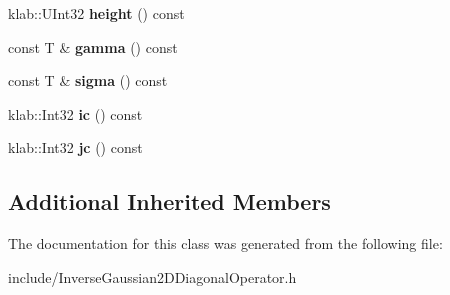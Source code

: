 \begin{DoxyCompactItemize}
\item 
klab\+::\+U\+Int32 {\bfseries height} () const \hypertarget{classkl1p_1_1TInverseGaussian2DDiagonalOperator_a218701d42bb73a32940a0e85230b5a8b}{}\label{classkl1p_1_1TInverseGaussian2DDiagonalOperator_a218701d42bb73a32940a0e85230b5a8b}

\item 
const T \& {\bfseries gamma} () const \hypertarget{classkl1p_1_1TInverseGaussian2DDiagonalOperator_aa57daba3bfaf40f9b4f5f19553b96e40}{}\label{classkl1p_1_1TInverseGaussian2DDiagonalOperator_aa57daba3bfaf40f9b4f5f19553b96e40}

\item 
const T \& {\bfseries sigma} () const \hypertarget{classkl1p_1_1TInverseGaussian2DDiagonalOperator_ae286bd89c6f96dc8da1817aad4458696}{}\label{classkl1p_1_1TInverseGaussian2DDiagonalOperator_ae286bd89c6f96dc8da1817aad4458696}

\item 
klab\+::\+Int32 {\bfseries ic} () const \hypertarget{classkl1p_1_1TInverseGaussian2DDiagonalOperator_a442a12a57cd0300b9293322515c2d3cb}{}\label{classkl1p_1_1TInverseGaussian2DDiagonalOperator_a442a12a57cd0300b9293322515c2d3cb}

\item 
klab\+::\+Int32 {\bfseries jc} () const \hypertarget{classkl1p_1_1TInverseGaussian2DDiagonalOperator_a0e56576685eaf236e5e0ad68c3e6ed9d}{}\label{classkl1p_1_1TInverseGaussian2DDiagonalOperator_a0e56576685eaf236e5e0ad68c3e6ed9d}

\end{DoxyCompactItemize}
\subsection*{Additional Inherited Members}


The documentation for this class was generated from the following file\+:\begin{DoxyCompactItemize}
\item 
include/Inverse\+Gaussian2\+D\+Diagonal\+Operator.\+h\end{DoxyCompactItemize}
